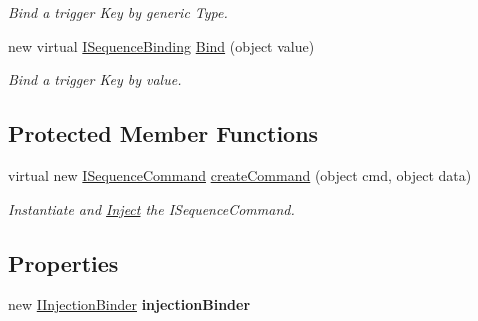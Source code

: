 \begin{DoxyCompactItemize}
\begin{DoxyCompactList}\small\item\em Bind a trigger Key by generic Type. \end{DoxyCompactList}\item 
\hypertarget{classstrange_1_1extensions_1_1sequencer_1_1impl_1_1_sequencer_a600c15d53b462688c4898f47e5b48ad2}{new virtual \hyperlink{interfacestrange_1_1extensions_1_1sequencer_1_1api_1_1_i_sequence_binding}{I\-Sequence\-Binding} \hyperlink{classstrange_1_1extensions_1_1sequencer_1_1impl_1_1_sequencer_a600c15d53b462688c4898f47e5b48ad2}{Bind} (object value)}\label{classstrange_1_1extensions_1_1sequencer_1_1impl_1_1_sequencer_a600c15d53b462688c4898f47e5b48ad2}

\begin{DoxyCompactList}\small\item\em Bind a trigger Key by value. \end{DoxyCompactList}\end{DoxyCompactItemize}
\subsection*{Protected Member Functions}
\begin{DoxyCompactItemize}
\item 
\hypertarget{classstrange_1_1extensions_1_1sequencer_1_1impl_1_1_sequencer_a6e1c819a7c2fe3fa12a40452ee622492}{virtual new \hyperlink{interfacestrange_1_1extensions_1_1sequencer_1_1api_1_1_i_sequence_command}{I\-Sequence\-Command} \hyperlink{classstrange_1_1extensions_1_1sequencer_1_1impl_1_1_sequencer_a6e1c819a7c2fe3fa12a40452ee622492}{create\-Command} (object cmd, object data)}\label{classstrange_1_1extensions_1_1sequencer_1_1impl_1_1_sequencer_a6e1c819a7c2fe3fa12a40452ee622492}

\begin{DoxyCompactList}\small\item\em Instantiate and \hyperlink{class_inject}{Inject} the I\-Sequence\-Command. \end{DoxyCompactList}\end{DoxyCompactItemize}
\subsection*{Properties}
\begin{DoxyCompactItemize}
\item 
\hypertarget{classstrange_1_1extensions_1_1sequencer_1_1impl_1_1_sequencer_a99cc8177a4eee4c38083a6de24daac1b}{new \hyperlink{interfacestrange_1_1extensions_1_1injector_1_1api_1_1_i_injection_binder}{I\-Injection\-Binder} {\bfseries injection\-Binder}}\label{classstrange_1_1extensions_1_1sequencer_1_1impl_1_1_sequencer_a99cc8177a4eee4c38083a6de24daac1b}

\end{DoxyCompactItemize}
